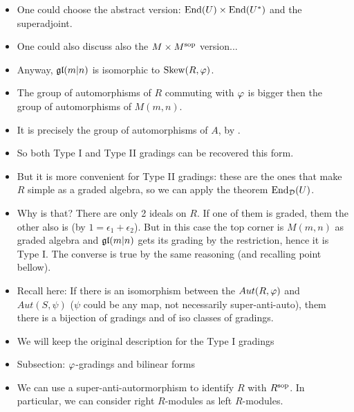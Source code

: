 \documentclass{amsbook}
\begin{document}
\begin{itemize}
        \item One could choose the abstract version: $\operatorname{End} (U) \times \operatorname{End}(U^*)$ and the superadjoint.
        
        \item One could also discuss also the $M \times M^{\mathrm{sop}}$ version...
        
        \item Anyway, $\mathfrak{gl}(m|n)$ is isomorphic to $\operatorname{Skew} (R, \varphi)$.
        
        \item The group of automorphisms of $R$ commuting with $\varphi$ is bigger then the group of automorphisms of $M(m,n)$.
        
        \item It is precisely the group of automorphisms of $A$, by \cite{serganova}.
        
        \item So both Type I and Type II gradings can be recovered this form.
        
        \item But it is more convenient for Type II gradings: these are the ones that make $R$ simple as a graded algebra, so we can apply the theorem $\operatorname{End}_{\mathcal{D}} (U)$.
        
        \item Why is that? There are only 2 ideals on $R$. If one of them is graded, them the other also is (by $1 =  \epsilon_1 + \epsilon_2$). But in this case the top corner is $M(m,n)$ as graded algebra and $\mathfrak{gl}(m|n)$ gets its grading by the restriction, hence it is Type I. The converse is true by the same reasoning (and recalling point bellow).
        
        \item Recall here: If there is an isomorphism between the $Aut(R, \varphi)$ and $Aut(S, \psi)$ ($\psi$ could be any map, not necessarily super-anti-auto), them there is a bijection of gradings and of iso classes of gradings.
        
        \item We will keep the original description for the Type I gradings
        
        \item Subsection: $\varphi$-gradings and bilinear forms
        
        \item We can use a super-anti-autormorphism to identify $R$ with $R^{\mathrm{sop}}$. In particular, we can consider right $R$-modules as left $R$-modules.
        

\end{itemize}
\end{document}
